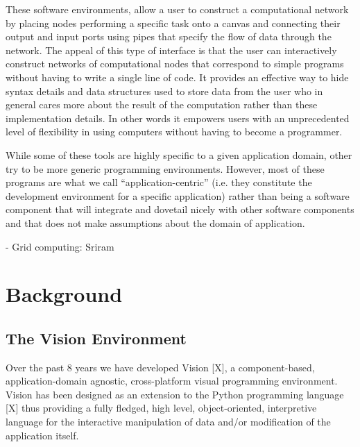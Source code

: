 \documentclass[conference]{IEEEtran}
\begin{document}
These software environments, allow a user to construct a computational
network by placing nodes performing a specific task onto a canvas and
connecting their output and input ports using pipes that specify the flow
of data through the network. The appeal of this type of interface is that
the user can interactively construct networks of computational nodes that
correspond to simple programs without having to write a single line of
code. It provides an effective way to hide syntax details and data
structures used to store data from the user who in general cares more about
the result of the computation rather than these implementation details. In
other words it empowers users with an unprecedented level of flexibility in
using computers without having to become a programmer.

While some of these tools are highly specific to a given application
domain, other try to be more generic programming environments. However,
most of these programs are what we call “application-centric” (i.e. they
constitute the development environment for a specific application) rather
than being a software component that will integrate and dovetail nicely
with other software components and that does not make assumptions about the
domain of application.

- Grid computing: Sriram

\section {Background}

\subsection {The Vision Environment}



Over the past 8 years we have developed Vision [X], a component-based,
application-domain agnostic, cross-platform visual programming environment.
Vision has been designed as an extension to the Python programming language
[X] thus providing a fully fledged, high level, object-oriented,
interpretive language for the interactive manipulation of data and/or
modification of the application itself.
\end{document}
